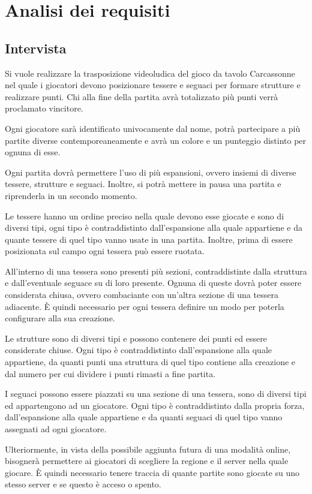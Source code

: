 \section{Analisi dei requisiti}
\subsection{Intervista}
Si vuole realizzare la trasposizione videoludica del gioco da tavolo Carcassonne \cite{Carcassonne} nel quale i giocatori devono posizionare tessere e seguaci per formare strutture e realizzare punti. Chi alla fine della partita avrà totalizzato più punti verrà proclamato vincitore.
\medskip

Ogni giocatore sarà identificato univocamente dal nome, potrà partecipare a più partite diverse contemporeaneamente e avrà un colore e un punteggio distinto per ognuna di esse.
\medskip

Ogni partita dovrà permettere l'uso di più espansioni, ovvero insiemi di diverse tessere, strutture e seguaci. Inoltre, si potrà mettere in pausa una partita e riprenderla in un secondo momento.
\medskip

Le tessere hanno un ordine preciso nella quale devono esse giocate e sono di diversi tipi, ogni tipo è contraddistinto dall'espansione alla quale appartiene e da quante tessere di quel tipo vanno usate in una partita. Inoltre, prima di essere posizionata sul campo ogni tessera può essere ruotata.
\medskip

All'interno di una tessera sono presenti più sezioni, contraddistinte dalla struttura e dall'eventuale seguace su di loro presente. Ognuna di queste dovrà poter essere considerata chiusa, ovvero combaciante con un'altra sezione di una tessera adiacente. È quindi necessario per ogni tessera definire un modo per poterla configurare alla sua creazione.
\medskip

Le strutture sono di diversi tipi e possono contenere dei punti ed essere considerate chiuse. Ogni tipo è contraddistinto dall'espansione alla quale appartiene, da quanti punti una struttura di quel tipo contiene alla creazione e dal numero per cui dividere i punti rimasti a fine partita.
\medskip

I seguaci possono essere piazzati su una sezione di una tessera, sono di diversi tipi ed appartengono ad un giocatore. Ogni tipo è contraddistinto dalla propria forza, dall'espansione alla quale appartiene e da quanti seguaci di quel tipo vanno assegnati ad ogni giocatore.
\medskip

Ulteriormente, in vista della possibile aggiunta futura di una modalità online, bisognerà permettere ai giocatori di scegliere la regione e il server nella quale giocare. È quindi necessario tenere traccia di quante partite sono giocate su uno stesso server e se questo è acceso o spento.

